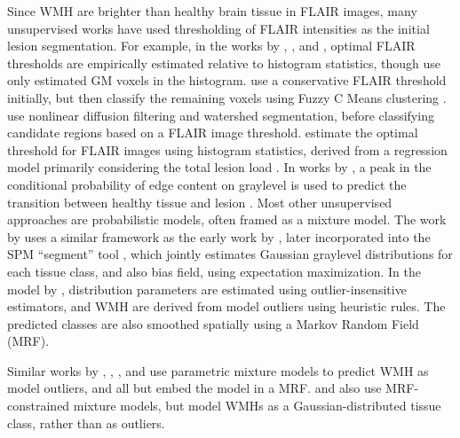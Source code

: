 Since WMH are brighter than healthy brain tissue in FLAIR images, many unsupervised works have used thresholding of FLAIR intensities as the initial lesion segmentation.
For example, in the works by \citeauthor{Jack2001} \cite{Jack2001}, \citeauthor{DeBoer2009b} \cite{DeBoer2009b}, and \citeauthor{Smart2011}, \cite{Smart2011} optimal FLAIR thresholds are empirically estimated relative to histogram statistics, though \citeauthor{DeBoer2009b} use only estimated GM voxels in the histogram.
\citeauthor{Gibson2010} use a conservative FLAIR threshold initially, but then classify the remaining voxels using Fuzzy C Means clustering \cite{Gibson2010}.
\citeauthor{Samaille2012} use nonlinear diffusion filtering and watershed segmentation, before classifying candidate regions based on a FLAIR image threshold.
\citeauthor{Yoo2014} estimate the optimal threshold for FLAIR images using histogram statistics, derived from a regression model primarily considering the total lesion load \cite{Yoo2014}.
In works by \citeauthor{Khademi2014}, a peak in the conditional probability of edge content on graylevel is used to predict the transition between healthy tissue and lesion \cite{Khademi2014,Khademi2015,Knight2016a}.
Most other unsupervised approaches are probabilistic models, often framed as a mixture model.
The work by \citeauthor{VanLeemput2001} \cite{VanLeemput2001} uses a similar framework as the early work by \citeauthor{Ashburner1997} \cite{Ashburner1997}, later incorporated into the SPM ``segment'' tool \cite{Ashburner2005}, which jointly estimates Gaussian graylevel distributions for each tissue class, and also bias field, using expectation maximization. In the model by \citeauthor{VanLeemput2001}, distribution parameters are estimated using outlier-insensitive estimators, and WMH are derived from model outliers using heuristic rules. The predicted classes are also smoothed spatially using a Markov Random Field (MRF).
\par
Similar works by \citeauthor{Bricq2008} \cite{Bricq2008}, \citeauthor{Schmidt2012} \cite{Schmidt2012}, \citeauthor{Jain2015} \cite{Jain2015}, and \citeauthor{Roura2015} \cite{Roura2015} use parametric mixture models to predict WMH as model outliers, and all but \cite{Roura2015} embed the model in a MRF.
\citeauthor{Khayati2008} \cite{Khayati2008} and \citeauthor{Subbanna2009} \cite{Subbanna2009} also use MRF-constrained mixture models, but model WMHs as a Gaussian-distributed tissue class, rather than as outliers.
